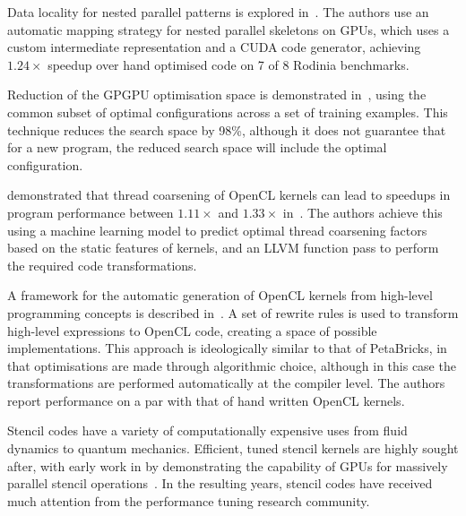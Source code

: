 Data locality for nested parallel patterns is explored in~\cite{Lee}. The authors use an automatic mapping strategy for nested parallel skeletons on GPUs, which uses a custom intermediate representation and a CUDA code generator, achieving $1.24\times$ speedup over hand optimised code on 7 of 8 Rodinia benchmarks.

Reduction of the GPGPU optimisation space is demonstrated in~\cite{Ryoo2008}, using the common subset of optimal configurations across a set of training examples. This technique reduces the search space by 98\%, although it does not guarantee that for a new program, the reduced search space will include the optimal configuration.

\citeauthor{Magni2014} demonstrated that thread coarsening of OpenCL kernels can lead to speedups in program performance between $1.11\times$ and $1.33\times$ in~\cite{Magni2014}. The authors achieve this using a machine learning model to predict optimal thread coarsening factors based on the static features of kernels, and an LLVM function pass to perform the required code transformations.

A framework for the automatic generation of OpenCL kernels from high-level programming concepts is described in~\cite{Steuwer2015}. A set of rewrite rules is used to transform high-level expressions to OpenCL code, creating a space of possible implementations. This approach is ideologically similar to that of PetaBricks, in that optimisations are made through algorithmic choice, although in this case the transformations are performed automatically at the compiler level. The authors report performance on a par with that of hand written OpenCL kernels.

Stencil codes have a variety of computationally expensive uses from fluid dynamics to quantum mechanics. Efficient, tuned stencil kernels are highly sought after, with early work in \citeyear{Bolz2003} by \citeauthor{Bolz2003} demonstrating the capability of GPUs for massively parallel stencil operations~\cite{Bolz2003}. In the resulting years, stencil codes have received much attention from the performance tuning research community.

